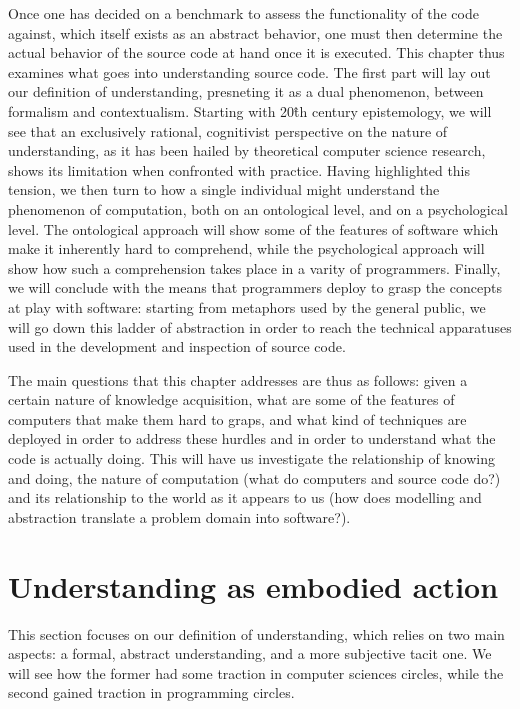 Once one has decided on a benchmark to assess the functionality of the code against, which itself exists as an abstract behavior, one must then determine the actual behavior of the source code at hand once it is executed. This chapter thus examines what goes into understanding source code. The first part will lay out our definition of understanding, presneting it as a dual phenomenon, between formalism and contextualism. Starting with 20\^{th} century epistemology, we will see that an exclusively rational, cognitivist perspective on the nature of understanding, as it has been hailed by theoretical computer science research, shows its limitation when confronted with practice. Having highlighted this tension, we then turn to how a single individual might understand the phenomenon of computation, both on an ontological level, and on a psychological level. The ontological approach will show some of the features of software which make it inherently hard to comprehend, while the psychological approach will show how such a comprehension takes place in a varity of programmers. Finally, we will conclude with the means that programmers deploy to grasp the concepts at play with software: starting from metaphors used by the general public, we will go down this ladder of abstraction in order to reach the technical apparatuses used in the development and inspection of source code.

The main questions that this chapter addresses are thus as follows: given a certain nature of knowledge acquisition, what are some of the features of computers that make them hard to graps, and what kind of techniques are deployed in order to address these hurdles and in order to understand what the code is actually doing. This will have us investigate the relationship of knowing and doing, the nature of computation (what do computers and source code do?) and its relationship to the world as it appears to us (how does modelling and abstraction translate a problem domain into software?).

\section{Understanding as embodied action} %

This section focuses on our definition of understanding, which relies on two main aspects: a formal, abstract understanding, and a more subjective tacit one. We will see how the former had some traction in computer sciences circles, while the second gained traction in programming circles.

